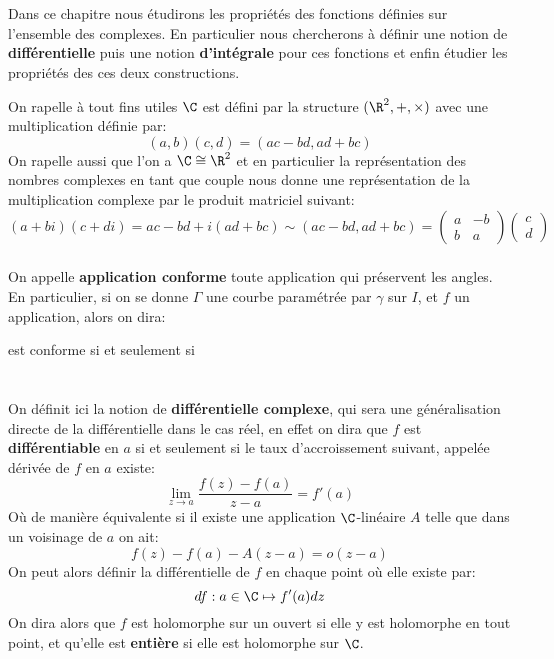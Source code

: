 \chapter*{} %
Dans ce chapitre nous étudirons les propriétés des fonctions définies sur l'ensemble des complexes. En particulier nous chercherons à définir une notion de \textbf{différentielle} puis une notion \textbf{d'intégrale} pour ces fonctions et enfin étudier les propriétés des ces deux constructions.\+

On rapelle à tout fins utiles \(\C\) est défini par la structure \((\R^2, +, \times)\) avec une multiplication définie par:
\[
   (a, b)(c, d) = (ac - bd, ad + bc)
\]
On rapelle aussi que l'on a \(\C \cong \R^2\) et en particulier la représentation des nombres complexes en tant que couple nous donne une représentation de la multiplication complexe par le produit matriciel suivant:
\[
   (a + bi)(c + di) = ac - bd + i(ad + bc) \sim (ac - bd, ad + bc) =  \begin{pmatrix}
      a & -b \\
      b & a
   \end{pmatrix} \begin{pmatrix}  c \\ d \end{pmatrix}
\]
\subsection*{}
On appelle \textbf{application conforme} toute application qui préservent les angles. En particulier, si on se donne \(\Gamma\) une courbe paramétrée par \(\gamma\) sur \(I\), et \(f\) un application, alors on dira:

est conforme si et seulement si


\chapter*{} %
On définit ici la notion de \textbf{différentielle complexe}, qui sera une généralisation directe de la différentielle dans le cas réel, en effet on dira que \(f\) est \textbf{différentiable} en \(a\) si et seulement si le taux d'accroissement suivant, appelée dérivée de \(f\) en \(a\) existe:
\[
   \lim_{z \rightarrow a} \frac{f(z) - f(a)}{z - a} = f'(a)
\]
Où de manière équivalente si il existe une application \(\C\)-linéaire \(A\) telle que dans un voisinage de \(a\) on ait:
\[
   f(z) - f(a) - A(z - a) = o(z - a)
\]
On peut alors définir la différentielle de \(f\) en chaque point où elle existe par:
\[
   df : a \in \C \mapsto f'(a)dz
\]
On dira alors que \(f\) est holomorphe sur un ouvert si elle y est holomorphe en tout point, et qu'elle est \textbf{entière} si elle est holomorphe sur \(\C\).
